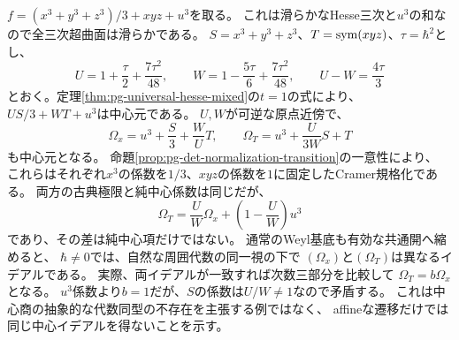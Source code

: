 \begin{example}[規格化の変更と中心三次イデアル]
\label{ex:pg-det-distinct-normalized-ideals}
$f=(x^3+y^3+z^3)/3+xyz+u^3$を取る。
これは滑らかなHesse三次と$u^3$の和なので全三次超曲面は滑らかである。
$S=x^3+y^3+z^3$、$T=\operatorname{sym}(xyz)$、$\tau=\hbar^2$とし、
\begin{equation}
 U=1+\frac{\tau}{2}+\frac{7\tau^2}{48},\qquad
 W=1-\frac{5\tau}{6}+\frac{7\tau^2}{48},\qquad
 U-W=\frac{4\tau}{3}
 \label{eq:pg-det-hesse-transition-coefficients}
\end{equation}
とおく。定理\ref{thm:pg-universal-hesse-mixed}の$t=1$の式により、
$US/3+WT+u^3$は中心元である。
$U,W$が可逆な原点近傍で、
\begin{equation}
 \Omega_x=u^3+\frac S3+\frac WU T,\qquad
 \Omega_T=u^3+\frac U{3W}S+T
 \label{eq:pg-det-hesse-normalized-centers}
\end{equation}
も中心元となる。
命題\ref{prop:pg-det-normalization-transition}の一意性により、
これらはそれぞれ$x^3$の係数を$1/3$、$xyz$の係数を$1$に固定したCramer規格化である。
両方の古典極限と純中心係数は同じだが、
\begin{equation}
 \Omega_T=\frac UW\Omega_x+
 \left(1-\frac UW\right)u^3
 \label{eq:pg-det-hesse-affine-transition}
\end{equation}
であり、その差は純中心項だけではない。
通常のWeyl基底も有効な共通開へ縮めると、
$\hbar\ne0$では、自然な周囲代数の同一視の下で
$(\Omega_x)$と$(\Omega_T)$は異なるイデアルである。
実際、両イデアルが一致すれば次数三部分を比較して
$\Omega_T=b\Omega_x$となる。
$u^3$係数より$b=1$だが、$S$の係数は$U/W\ne1$なので矛盾する。
これは中心商の抽象的な代数同型の不存在を主張する例ではなく、
affineな遷移だけでは同じ中心イデアルを得ないことを示す。
\end{example}


